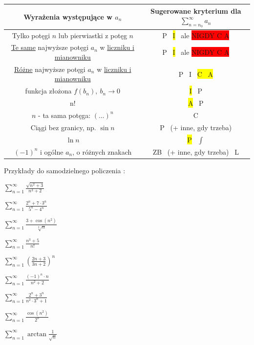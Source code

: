 \begin{table}[!htbp]
    \centering
    \begin{adjustbox}{width=0.9\textwidth}
    \begin{tabular}{|c|c|}
    \hline
    Wyrażenia występujące w $a_n$ & Sugerowane kryterium dla $ \sum\limits_{n=n_0}^{\infty} a_n $ \\[15pt] \hline
    Tylko potęgi $n$ lub pierwiastki z potęg $n$ & P \ \colorbox{yellow}{I} \ ale \colorbox{red}{NIGDY C A} \\[10pt] \hline 
    \underline{Te same} najwyższe potęgi $a_n$ w \underline{liczniku i mianowniku} & P \ \colorbox{yellow}{I} \ ale \colorbox{red}{NIGDY C A} \\[10pt] \hline
    \underline{Różne} najwyższe potęgi $a_n$ w \underline{liczniku i mianowniku} & P \ I \ \colorbox{yellow}{C \ A} \\[10pt] \hline
    funkcja złożona $ f(b_n), \ b_n \to 0 $ & \colorbox{yellow}{I} \ P \\[10pt] \hline
    n! & \colorbox{yellow}{A} \ P \\[10pt] \hline
    $n$ - ta sama potęga: $(...)^n$ & C \\[10pt] \hline
    Ciągi bez granicy, np. $\sin n$ & P \ (+ inne, gdy trzeba) \\[10pt] \hline
    $\ln n$ & \colorbox{yellow}{P} \ $\int$ \\[10pt] \hline
    $(-1)^n$ i ogólne $a_n$, o różnych znakach & ZB \ (+ inne, gdy trzeba) \ L \\[10pt] \hline
    \end{tabular}
\end{adjustbox}
\end{table}

\pagebreak

Przykłady do samodzielnego policzenia :

$ \sum\limits_{n = 1}^{\infty} \frac{\sqrt{n^2 + 3}}{n^3 + 2} $

$ \sum\limits_{n = 1}^{\infty} \frac{2^n + 7 \cdot 3^n}{5^n - 4^n} $

$ \sum\limits_{n = 1}^{\infty} \frac{3 + \cos (n^2)}{\sqrt[3]{n}} $

$ \sum\limits_{n = 1}^{\infty} \frac{n^3 + 5}{n!} $

$ \sum\limits_{n = 1}^{\infty} \left( \frac{2n+3}{3n+2} \right)^n $

$ \sum\limits_{n = 1}^{\infty} \frac{(-1)^n \cdot n}{n^2 + 2} $

$ \sum\limits_{n = 1}^{\infty} \frac{2^n + 3^n}{n^2 \cdot 3^n + 1} $

$ \sum\limits_{n = 1}^{\infty} \frac{\cos (n^2)}{2^n} $

$ \sum\limits_{n = 1}^{\infty} \arctan \frac{1}{\sqrt{n}} $